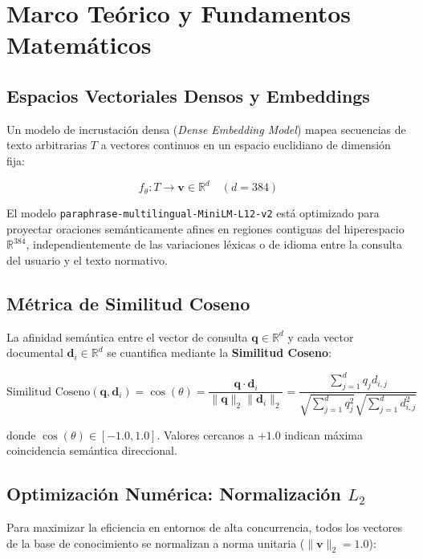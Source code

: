 \documentclass[12pt,letterpaper]{article}
\begin{document}
\section{Marco Teórico y Fundamentos Matemáticos}

\subsection{Espacios Vectoriales Densos y Embeddings}
Un modelo de incrustación densa (\textit{Dense Embedding Model}) mapea secuencias de texto arbitrarias $T$ a vectores continuos en un espacio euclidiano de dimensión fija:

\begin{equation}
f_{\theta}: T \longrightarrow \mathbf{v} \in \mathbb{R}^d \quad (d = 384)
\end{equation}

El modelo \texttt{paraphrase-multilingual-MiniLM-L12-v2} está optimizado para proyectar oraciones semánticamente afines en regiones contiguas del hiperespacio $\mathbb{R}^{384}$, independientemente de las variaciones léxicas o de idioma entre la consulta del usuario y el texto normativo.

\subsection{Métrica de Similitud Coseno}
La afinidad semántica entre el vector de consulta $\mathbf{q} \in \mathbb{R}^d$ y cada vector documental $\mathbf{d}_i \in \mathbb{R}^d$ se cuantifica mediante la \textbf{Similitud Coseno}:

\begin{equation}
\text{Similitud Coseno}(\mathbf{q}, \mathbf{d}_i) = \cos(\theta) = \frac{\mathbf{q} \cdot \mathbf{d}_i}{\|\mathbf{q}\|_2 \|\mathbf{d}_i\|_2} = \frac{\sum_{j=1}^d q_j d_{i,j}}{\sqrt{\sum_{j=1}^d q_j^2} \sqrt{\sum_{j=1}^d d_{i,j}^2}}
\end{equation}

\noindent donde $\cos(\theta) \in [-1.0, 1.0]$. Valores cercanos a $+1.0$ indican máxima coincidencia semántica direccional.

\subsection{Optimización Numérica: Normalización $L_2$}
Para maximizar la eficiencia en entornos de alta concurrencia, todos los vectores de la base de conocimiento se normalizan a norma unitaria ($\|\mathbf{v}\|_2 = 1.0$):
\end{document}
